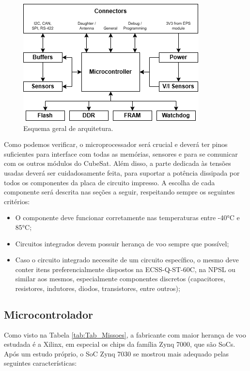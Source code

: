 \begin{figure}[H]
    \centering
    \includegraphics[scale=0.8]{images/arquitetura geral.png}
    \caption{Esquema geral de arquitetura.}
    \label{fig:arq_geral}
\end{figure}

Como podemos verificar, o microprocessador será crucial e deverá ter pinos suficientes para interface com todas as memórias, sensores e para se comunicar com os outros módulos do CubeSat. Além disso, a parte dedicada às tensões usadas deverá ser cuidadosamente feita, para suportar a potência dissipada por todos os componentes da placa de circuito impresso. A escolha de cada componente será descrita nas seções a seguir, respeitando sempre os seguintes critérios:

\begin{itemize}
	\item O componente deve funcionar corretamente nas temperaturas entre -40°C e 85°C;
	\item Circuitos integrados devem possuir herança de voo sempre que possível;
	\item Caso o circuito integrado necessite de um circuito específico, o mesmo deve conter itens preferencialmente dispostos na ECSS-Q-ST-60C, na NPSL ou similar aos mesmos, especialmente componentes discretos (capacitores, resistores, indutores, diodos, transistores, entre outros);
\end{itemize}

\subsection{Microcontrolador}

Como visto na Tabela \ref{tab:Tab_Missoes}, a fabricante com maior herança de voo estudada é a Xilinx, em especial os chips da família Zynq 7000, que são SoCs. Após um estudo próprio, o SoC Zynq 7030 se mostrou mais adequado pelas seguintes características:

